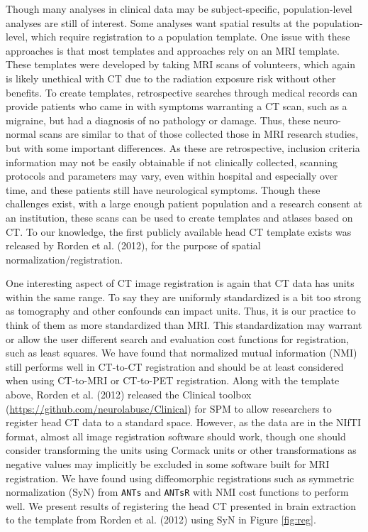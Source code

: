 \documentclass[utf8]{frontiersSCNS}
\begin{document}
Though many analyses in clinical data may be subject-specific, population-level analyses are still of interest. Some analyses want spatial results at the population-level, which require registration to a population template. One issue with these approaches is that most templates and approaches rely on an MRI template. These templates were developed by taking MRI scans of volunteers, which again is likely unethical with CT due to the radiation exposure risk without other benefits. To create templates, retrospective searches through medical records can provide patients who came in with symptoms warranting a CT scan, such as a migraine, but had a diagnosis of no pathology or damage. Thus, these neuro-normal scans are similar to that of those collected those in MRI research studies, but with some important differences. As these are retrospective, inclusion criteria information may not be easily obtainable if not clinically collected, scanning protocols and parameters may vary, even within hospital and especially over time, and these patients still have neurological symptoms. Though these challenges exist, with a large enough patient population and a research consent at an institution, these scans can be used to create templates and atlases based on CT. To our knowledge, the first publicly available head CT template exists was released by Rorden et al. (2012), for the purpose of spatial normalization/registration.

One interesting aspect of CT image registration is again that CT data has units within the same range. To say they are uniformly standardized is a bit too strong as tomography and other confounds can impact units. Thus, it is our practice to think of them as more standardized than MRI. This standardization may warrant or allow the user different search and evaluation cost functions for registration, such as least squares. We have found that normalized mutual information (NMI) still performs well in CT-to-CT registration and should be at least considered when using CT-to-MRI or CT-to-PET registration. Along with the template above, Rorden et al. (2012) released the Clinical toolbox (\url{https://github.com/neurolabusc/Clinical}) for SPM to allow researchers to register head CT data to a standard space. However, as the data are in the NIfTI format, almost all image registration software should work, though one should consider transforming the units using Cormack units or other transformations as negative values may implicitly be excluded in some software built for MRI registration. We have found using diffeomorphic registrations such as symmetric normalization (SyN) from \texttt{ANTs} and \texttt{ANTsR} with NMI cost functions to perform well. We present results of registering the head CT presented in brain extraction to the template from Rorden et al. (2012) using SyN in Figure \ref{fig:reg}.
\end{document}
